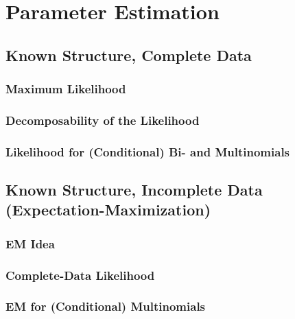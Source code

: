     \section{Parameter Estimation} %

        \subsection{Known Structure, Complete Data} %

            \subsubsection{Maximum Likelihood} %

            \subsubsection{Decomposability of the Likelihood} %

            \subsubsection{Likelihood for (Conditional) Bi- and Multinomials} %

        \subsection{Known Structure, Incomplete Data (Expectation-Maximization)} %

            \subsubsection{EM Idea} %

            \subsubsection{Complete-Data Likelihood} %

            \subsubsection{EM for (Conditional) Multinomials} %

